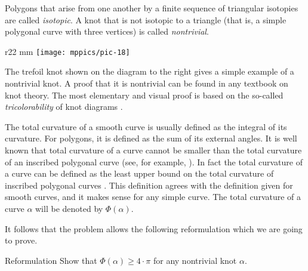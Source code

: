 Polygons that arise from one another by a finite sequence of
triangular isotopies are called \emph{isotopic}.
A knot that is not isotopic to a triangle (that is, a simple polygonal curve with three vertices) is called \emph{nontrivial}.

\begin{wrapfigure}{r}{22 mm}
\vskip-3mm
\centering
\texttt{[image: mppics/pic-18]}
\vskip0mm
\end{wrapfigure}

The trefoil knot shown on the diagram to the right gives a simple example of a nontrivial knot.
A proof that it is nontrivial can be found in any textbook on knot theory.
The most elementary and visual proof is based on the so-called \emph{tricolorability} of knot diagrams \cite[Section 1.5]{adams}.

The total curvature of a smooth curve is usually defined as the integral of its curvature.
For polygons, it is defined as the sum of its external angles.
It is well known that total curvature of a curve cannot be smaller than the total curvature of an inscribed polygonal curve (see, for example, \cite{petrunin-zamora}).
In fact the total curvature of a curve can be defined as the least upper bound on the total curvature of inscribed polygonal curves \cite{aleksandrov-reshetnyak, sullivan-curves}.
This definition agrees with the definition given for smooth curves, and it makes sense for any simple curve.
The total curvature of a curve $\alpha$ will be denoted by $\Phi(\alpha)$.

It follows that the problem allows the following reformulation which we are going to prove.

\begin{thm}{Reformulation}\label{thm:fary-milnor}
Show that $\Phi(\alpha)\ge 4\cdot\pi$ for any nontrivial knot $\alpha$. 
\end{thm} 


